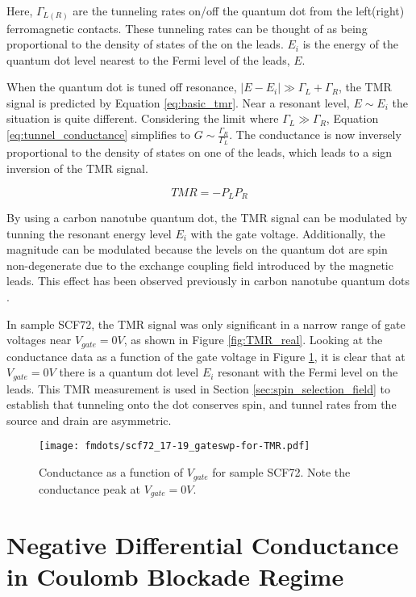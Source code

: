 Here, $\Gamma_{L(R)}$ are the tunneling rates on/off the quantum dot from the left(right) ferromagnetic contacts. These tunneling rates can be thought of as being proportional to the density of states of the on the leads. $E_i$ is the energy of the quantum dot level nearest to the Fermi level of the leads, $E$. 

When the quantum dot is tuned off resonance, $|E-E_i| \gg \Gamma_L + \Gamma_R$, the TMR signal is predicted by Equation \ref{eq:basic_tmr}. Near a resonant level, $E \sim E_i$ the situation is quite different. Considering the limit where $\Gamma_L \gg \Gamma_R$, Equation \ref{eq:tunnel_conductance} simplifies to $G \sim \frac{\Gamma_R}{\Gamma_L}$. The conductance is now inversely proportional to the density of states on one of the leads, which leads to a sign inversion of the TMR signal.

\begin{equation}
\label{eq:sign_inversion}
    TMR = -P_L P_R
\end{equation}

By using a carbon nanotube quantum dot, the TMR signal can be modulated by tunning the resonant energy level $E_i$ with the gate voltage. Additionally, the magnitude can be modulated because the levels on the quantum dot are spin non-degenerate due to the exchange coupling field introduced by the magnetic leads. This effect has been observed previously in carbon nanotube quantum dots \cite{Sahoo2005, Thamankar2006}. 

In sample SCF72, the TMR signal was only significant in a narrow range of gate voltages near $V_{gate}=0V$, as shown in Figure \ref{fig:TMR_real}. Looking at the conductance data as a function of the gate voltage in Figure \ref{fig:TMR_gate}, it is clear that at $V_{gate}=0V$ there is a quantum dot level $E_i$ resonant with the Fermi level on the leads. This TMR measurement is used in Section \ref{sec:spin_selection_field} to establish that tunneling onto the dot conserves spin, and tunnel rates from the source and drain are asymmetric.

\begin{figure}
    \centering
    \texttt{[image: fmdots/scf72\_17-19\_gateswp-for-TMR.pdf]}
    \caption{Conductance as a function of $V_{gate}$ for sample SCF72. Note the conductance peak at $V_{gate}=0V$.}
    \label{fig:TMR_gate}
\end{figure}

\section{Negative Differential Conductance in Coulomb Blockade Regime}

